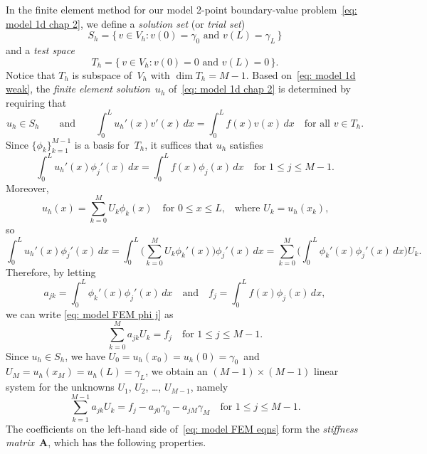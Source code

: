 In the finite element method for our model 2-point boundary-value 
problem~\eqref{eq: model 1d chap 2}, we define a \emph{solution set} (or
\emph{trial set})
\[
S_h=\{\,v\in V_h:\text{$v(0)=\gamma_0$ and $v(L)=\gamma_L$}\,\}
\]
and a \emph{test space}
\[
T_h=\{\,v\in V_h:\text{$v(0)=0$ and $v(L)=0$}\,\}.
\]
Notice that $T_h$ is subspace of~$V_h$ with $\dim T_h=M-1$.  Based 
on~\eqref{eq: model 1d weak}, the \emph{finite element solution}~$u_h$
of~\eqref{eq: model 1d chap 2} is determined by requiring that
\[
u_h\in S_h\qquad\text{and}\qquad
\int_0^L u_h'(x)v'(x)\,dx=\int_0^L f(x)v(x)\,dx \quad\text{for all $v\in T_h$.}
\]
Since $\{\phi_k\}_{k=1}^{M-1}$ is a basis for~$T_h$, it suffices that $u_h$ 
satisfies
\begin{equation}\label{eq: model FEM phi j}
\int_0^L u_h'(x)\phi_j'(x)\,dx=\int_0^L f(x)\phi_j(x)\,dx 
    \quad\text{for $1\le j\le M-1$.}
\end{equation}
Moreover, 
\begin{equation}\label{eq: uh U 1d}
u_h(x)=\sum_{k=0}^M U_k\phi_k(x)\quad\text{for $0\le x\le L$,}\quad
\text{where $U_k=u_h(x_k)$,}
\end{equation}
so
\[
\int_0^Lu_h'(x)\phi_j'(x)\,dx
    =\int_0^L\biggl(\sum_{k=0}^MU_k\phi_k'(x)\biggr)\phi_j'(x)\,dx
    =\sum_{k=0}^M\biggl(\int_0^L\phi_k'(x)\phi_j'(x)\,dx\biggr)U_k.
\]
Therefore, by letting
\[
a_{jk}=\int_0^L\phi_k'(x)\phi_j'(x)\,dx
\quad\text{and}\quad
f_j=\int_0^Lf(x)\phi_j(x)\,dx,
\]
we can write \eqref{eq: model FEM phi j} as
\[
\sum_{k=0}^M a_{jk}U_k=f_j\quad\text{for $1\le j\le M-1$.}
\]
Since $u_h\in S_h$, we have $U_0=u_h(x_0)=u_h(0)=\gamma_0$~and 
$U_M=u_h(x_M)=u_h(L)=\gamma_L$, we obtain an $(M-1)\times(M-1)$ linear system 
for the unknowns $U_1$, $U_2$, \dots, $U_{M-1}$, namely
\begin{equation}\label{eq: model FEM eqns}
\sum_{k=1}^{M-1}a_{jk}U_k=f_j-a_{j0}\gamma_0-a_{jM}\gamma_M
    \quad\text{for $1\le j\le M-1$.}
\end{equation}
The coefficients on the left-hand side of~\eqref{eq: model FEM eqns} form the
\emph{stiffness matrix}~$\boldsymbol{A}$, which has the following properties.


